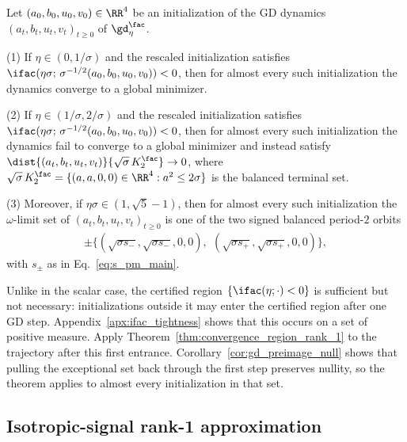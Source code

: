 \documentclass{article}
\begin{document}
\begin{theorem}\label{thm:convergence_region_rank_1}
Let $(a_0, b_0, u_0, v_0) \in \RR^4$ be an initialization of the GD
dynamics $(a_t,b_t,u_t,v_t)_{t\ge0}$ of $\gd_\eta^\fac$.

(1) If $\eta \in (0, 1/\sigma)$ and the rescaled initialization satisfies
$\ifac(\eta\sigma;\,\sigma^{-1/2}(a_0,b_0,u_0,v_0)) < 0$, then for almost
every such initialization the dynamics converge to a global minimizer.

(2) If $\eta \in (1/\sigma,2/\sigma)$ and the rescaled initialization satisfies
$\ifac(\eta\sigma;\,\sigma^{-1/2}(a_0,b_0,u_0,v_0)) < 0$, then for almost
every such initialization the dynamics fail to converge to a global minimizer and instead
satisfy $\dist{(a_t,b_t,u_t,v_t)}{\sqrt\sigma\,K_2^\fac}\to 0$, where
$\sqrt\sigma\,K_2^\fac=\{(a,a,0,0)\in\RR^4 : a^2\le 2\sigma\}$ is the balanced
terminal set.

(3) Moreover, if $\eta\sigma \in (1,\sqrt5-1)$, then for almost every such
initialization the $\omega$-limit set of $(a_t,b_t,u_t,v_t)_{t\ge0}$ is one
of the two signed balanced period-$2$ orbits
\begin{align}
    \pm\bigl\{
        (\sqrt{\sigma s_-},\sqrt{\sigma s_-},0,0),\ \,
        (\sqrt{\sigma s_+},\sqrt{\sigma s_+},0,0)
    \bigr\},
\end{align}
with $s_\pm$ as in Eq.~\eqref{eq:s_pm_main}.
\end{theorem}

\begin{remark}
\label{rmk:convergence_region_not_sharp}
Unlike in the scalar case, the certified region $\{\ifac(\eta;\cdot)<0\}$ is
sufficient but not necessary: initializations outside it may enter the
certified region after one GD step. Appendix~\ref{apx:ifac_tightness} shows
that this occurs on a set of positive measure. Apply
Theorem~\ref{thm:convergence_region_rank_1} to the trajectory after this first
entrance. Corollary~\ref{cor:gd_preimage_null} shows that pulling the
exceptional set back through the first step preserves nullity, so the theorem
applies to almost every initialization in that set.
\end{remark}

\subsection{Isotropic-signal rank-1 approximation}
\label{subsec:rank1_approx_general}
\end{document}
